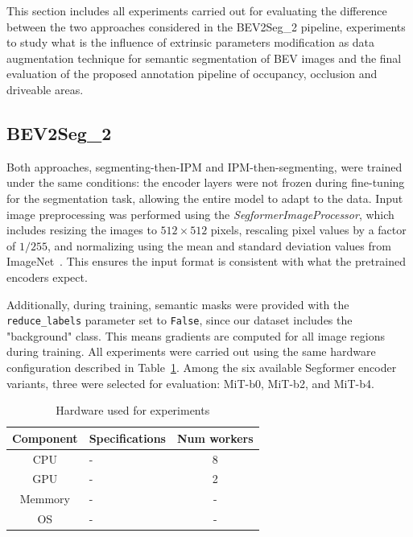 
This section includes all experiments carried out for evaluating the difference between the two approaches considered in the BEV2Seg\_2 pipeline, experiments to study what is the influence of extrinsic parameters modification as data augmentation technique for semantic segmentation of BEV images and the final evaluation of the proposed annotation pipeline of occupancy, occlusion and driveable areas.

\subsection{BEV2Seg\_2}
Both approaches, segmenting-then-IPM and IPM-then-segmenting, were trained under the same conditions: the encoder layers were not frozen during fine-tuning for the segmentation task, allowing the entire model to adapt to the data. Input image preprocessing was performed using the \textit{SegformerImageProcessor}, which includes resizing the images to $512 \times 512$ pixels, rescaling pixel values by a factor of $1/255$, and normalizing using the mean and standard deviation values from ImageNet~\cite{imagenet}. This ensures the input format is consistent with what the pretrained encoders expect.

Additionally, during training, semantic masks were provided with the \texttt{reduce\_labels} parameter set to \texttt{False}, since our dataset includes the "background" class. This means gradients are computed for all image regions during training. All experiments were carried out using the same hardware configuration described in Table~\ref{tab:hardware}. Among the six available Segformer encoder variants, three were selected for evaluation: MiT-b0, MiT-b2, and MiT-b4.

\begin{table}[h]
    \centering
    \begin{tabular}{c l c}
        \toprule
        \textbf{Component} & \textbf{Specifications} & \textbf{Num workers} \\
        \midrule
        CPU         & - & 8 \\
        GPU         & - & 2 \\      
        Memmory     & - & - \\
        OS          & - & - \\
        \bottomrule
    \end{tabular}
    \caption{ Hardware used for experiments }
    \label{tab:hardware}
\end{table}

